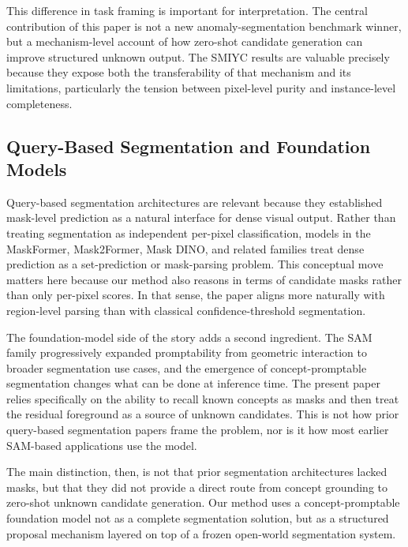 \documentclass[a4paper,fleqn]{cas-dc}
\begin{document}
This difference in task framing is important for interpretation. The central contribution of this paper is not a new anomaly-segmentation benchmark winner, but a mechanism-level account of how zero-shot candidate generation can improve structured unknown output. The SMIYC results are valuable precisely because they expose both the transferability of that mechanism and its limitations, particularly the tension between pixel-level purity and instance-level completeness.


\subsection{Query-Based Segmentation and Foundation Models}
\label{sec:related:foundation}

Query-based segmentation architectures are relevant because they established mask-level prediction as a natural interface for dense visual output. Rather than treating segmentation as independent per-pixel classification, models in the MaskFormer, Mask2Former, Mask DINO, and related families treat dense prediction as a set-prediction or mask-parsing problem. This conceptual move matters here because our method also reasons in terms of candidate masks rather than only per-pixel scores. In that sense, the paper aligns more naturally with region-level parsing than with classical confidence-threshold segmentation.

The foundation-model side of the story adds a second ingredient. The SAM family progressively expanded promptability from geometric interaction to broader segmentation use cases, and the emergence of concept-promptable segmentation changes what can be done at inference time. The present paper relies specifically on the ability to recall known concepts as masks and then treat the residual foreground as a source of unknown candidates. This is not how prior query-based segmentation papers frame the problem, nor is it how most earlier SAM-based applications use the model.

The main distinction, then, is not that prior segmentation architectures lacked masks, but that they did not provide a direct route from concept grounding to zero-shot unknown candidate generation. Our method uses a concept-promptable foundation model not as a complete segmentation solution, but as a structured proposal mechanism layered on top of a frozen open-world segmentation system.
\end{document}
